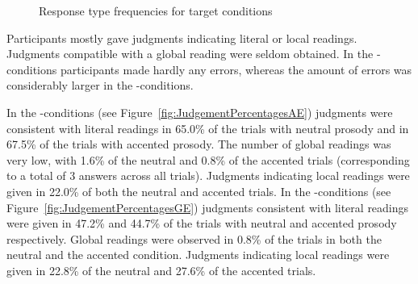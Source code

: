 \documentclass[fleqn,reqno,10pt,draft]{article}
\newcommand{\as}{\acro{as}}
\renewcommand{\es}{\acro{es}}
\begin{document}
\begin{figure}[]
{

\label{fig:JudgementPercentagesGE}
}
\caption[Optional caption for list of figures]{Response type
  frequencies for target conditions}
\label{fig:JudgementPercentages}
\end{figure}
%
Participants mostly gave judgments indicating literal or local
readings. Judgments compatible with a global reading were seldom
obtained. In the \as-conditions participants made hardly any errors,
whereas the amount of errors was considerably larger in the
\es-conditions.

In the \as-conditions (see Figure~\ref{fig:JudgementPercentagesAE})
judgments were consistent with literal readings in 65.0\% of the
trials with neutral prosody and in 67.5\% of the trials with accented
prosody. The number of global readings was very low,
with 1.6\% of the neutral and 0.8\% of the accented trials
(corresponding to a total of 3 answers across all trials). Judgments
indicating local readings were given in 22.0\% of both the neutral and
accented trials. In the \es-conditions (see
Figure~\ref{fig:JudgementPercentagesGE}) judgments consistent with
literal readings were given in 47.2\% and 44.7\% of the trials with
neutral and accented prosody respectively. Global readings were
observed in 0.8\% of the trials in both the neutral and the accented
condition. Judgments indicating local readings were given in 22.8\% of
the neutral and 27.6\% of the accented trials.
\end{document}
